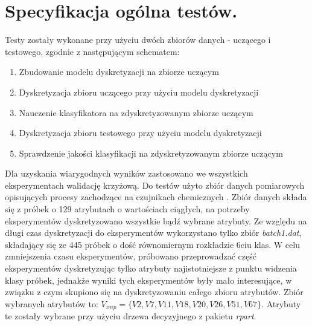 \section{Specyfikacja ogólna testów.}
 Testy zostały wykonane przy użyciu dwóch zbiorów danych - uczącego i testowego, zgodnie z następującym schematem:
\begin{enumerate}
	\item{Zbudowanie modelu dyskretyzacji na zbiorze uczącym}
	\item{Dyskretyzacja zbioru uczącego przy użyciu modelu dyskretyzacji}
	\item{Nauczenie klasyfikatora na zdyskretyzowanym zbiorze uczącym}
	\item{Dyskretyzacja zbioru testowego przy użyciu modelu dyskretyzacji}
	\item{Sprawdzenie jakości klasyfikacji na zdyskretyzowanym zbiorze uczącym}
\end{enumerate}
Dla uzyskania wiarygodnych wyników zastosowano we wszystkich eksperymentach walidację krzyżową. Do testów użyto zbiór danych pomiarowych opisujących procesy zachodzące na czujnikach chemicznych \cite{Gas:2012}. Zbiór danych składa się z próbek o 129 atrybutach o wartościach ciągłych, na potrzeby eksperymentów dyskretyzowano wszystkie bądź wybrane atrybuty. Ze względu na długi czas dyskretyzacji do eksperymentów wykorzystano tylko zbiór \emph{batch1.dat}, składający się ze 445 próbek o dość równomiernym rozkładzie 6ciu klas. W celu zmniejszenia czasu eksperymentów, próbowano przeprowadzać część eksperymentów dyskretyzując tylko atrybuty najistotniejsze z punktu widzenia klasy próbek, jednakże wyniki tych eksperymentów były mało interesujące, w związku z czym skupiono się na dyskretyzowaniu całego zbioru atrybutów. Zbiór wybranych atrybutów to: $V_{imp} = \{V2, V7, V11, V18, V20, V26, V51, V67\}$. Atrybuty te zostały wybrane przy użyciu drzewa decyzyjnego z pakietu \emph{rpart}.


